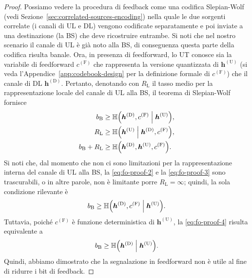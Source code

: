 \begin{proof}
    Possiamo vedere la procedura di feedback come una codifica Slepian-Wolf
    (vedi Sezione~\ref{sec:correlated-sources-encoding}) nella quale le due
    sorgenti correlate (i canali di UL e DL) vengono codificate separatamente e
    poi inviate a una destinazione (la BS) che deve ricostruire entrambe. Si
    noti che nel nostro scenario il canale di UL è già noto alla BS, di
    conseguenza questa parte della codifica risulta banale. Ora, in presenza di
    feedforward, lo UT conosce sia la variabile di feedforward
    \(c^\mathrm{(F)}\) che rappresenta la versione quantizzata di
    \(\bm{h}^\mathrm{(U)}\) (si veda l'Appendice~\ref{app:codebook-design} per
    la definizione formale di \(c^\mathrm{(F)}\)) che il canale di DL
    \(\bm{h}^\mathrm{(D)}\). Pertanto, denotando con \(R_\mathrm{L}\) il tasso
    medio per la rappresentazione locale del canale di UL alla BS, il teorema
    di Slepian-Wolf fornisce
    \begin{alignat}{1}
        b_\mathrm{B} &\ge \entropy{
            \bm{h}^\mathrm{(D)},c^\mathrm{(F)} \given \bm{h}^\mathrm{(U)}
        }, \label{eq:fo-proof-1} \\
        R_\mathrm{L} &\ge \entropy{
            \bm{h}^\mathrm{(U)} \given \bm{h}^\mathrm{(D)},c^\mathrm{(F)}
        }, \label{eq:fo-proof-2} \\
        b_\mathrm{B} + R_\mathrm{L} &\ge \entropy{
            \bm{h}^\mathrm{(D)},\bm{h}^\mathrm{(U)},c^\mathrm{(F)}
        }. \label{eq:fo-proof-3}
    \end{alignat}
    Si noti che, dal momento che non ci sono limitazioni per la
    rappresentazione interna del canale di UL alla BS, la \eqref{eq:fo-proof-2}
    e la \eqref{eq:fo-proof-3} sono trascurabili, o in altre parole, non è
    limitante porre \(R_\mathrm{L} = \infty\); quindi, la sola condizione
    rilevante è
    \vspace{0.1pt}  %
    \begin{equation}
        \label{eq:fo-proof-4}
        b_\mathrm{B} \ge \entropy{
            \bm{h}^\mathrm{(D)},c^\mathrm{(F)} \given \bm{h}^\mathrm{(U)}
        }.
    \end{equation}
    Tuttavia, poiché \(c^\mathrm{(F)}\) è funzione deterministica di
    \(\bm{h}^\mathrm{(U)}\), la \eqref{eq:fo-proof-4} risulta equivalente a
    \begin{equation}
        \label{eq:fo-proof-5}
        b_\mathrm{B} \ge \entropy{
            \bm{h}^\mathrm{(D)} \given \bm{h}^\mathrm{(U)}
        }.
    \end{equation}
    Quindi, abbiamo dimostrato che la segnalazione in feedforward non è utile
    al fine di ridurre i bit di feedback.
\end{proof}


